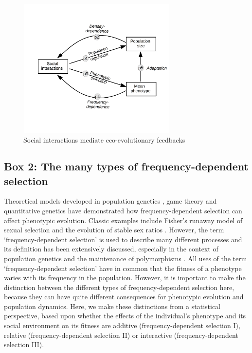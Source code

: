 \documentclass{article}
\begin{document}
	
	\begin{figure}[H]
		\renewcommand{\figurename}{Figure B1.}
		\centering
		\includegraphics[width=8cm, height=7cm]{Figures/Fig1.jpg}
		\let\nobreakspace\relax
		\caption{Social interactions mediate eco-evolutionary feedbacks}
	\end{figure}
	
	
	\newpage
	\subsection{Box 2: The many types of frequency-dependent selection} 
	\setcounter{figure}{0}    
	\noindent Theoretical models developed in population genetics \citep{Fisher1930, Wright1969}, game theory \citep{MaynardSmith1982, McGill2007, McNamaraLeimar2020} and quantitative genetics \citep{Lande1976, Lande2007, Engen2020} have demonstrated how frequency-dependent selection can affect phenotypic evolution. Classic examples include Fisher's runaway model of sexual selection and the evolution of stable sex ratios \citep{Fisher1930}. However, the term `frequency-dependent selection' is used to describe many different processes and its definition has been extensively discussed, especially in the context of population genetics and the maintenance of polymorphisms \citep{Ayala1974, Gromko1977, Heino1998}. All uses of the term `frequency-dependent selection' have in common that the fitness of a phenotype varies with its frequency in the population. However, it is important to make the distinction between the different types of frequency-dependent selection here, because they can have quite different consequences for phenotypic evolution and population dynamics. Here, we make these distinctions from a statistical perspective, based upon whether the effects of the individual's phenotype and its social environment on its fitness are additive (frequency-dependent selection I), relative (frequency-dependent selection II) or interactive (frequency-dependent selection III).
	
\end{document}
